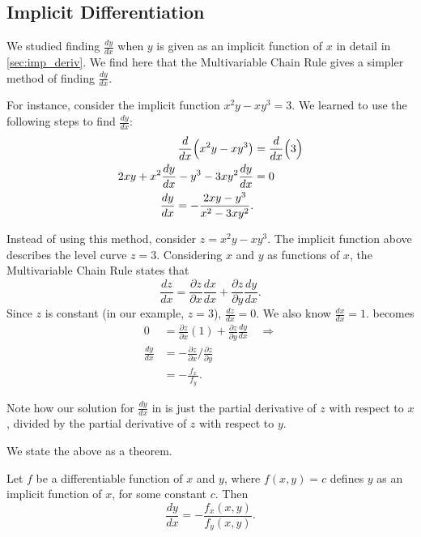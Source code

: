\subsection*{Implicit Differentiation}

We studied finding $\frac{dy}{dx}$ when $y$ is given as an implicit function of $x$ in detail in \autoref{sec:imp_deriv}. We find here that the Multivariable Chain Rule gives a simpler method of finding $\frac{dy}{dx}$.

For instance, consider the implicit function $x^2y-xy^3=3.$ We learned to use the following steps to find $\frac{dy}{dx}$:
\begin{align}
\frac{d}{dx}\Big(x^2y-xy^3\big) &= \frac{d}{dx}\Big(3\Big) \notag\\
2xy + x^2\frac{dy}{dx}-y^3-3xy^2\frac{dy}{dx} &= 0\notag \\
\frac{dy}{dx} = -\frac{2xy-y^3}{x^2-3xy^2}.\label{eq:mchain2}
\end{align}

Instead of using this method, consider $z=x^2y-xy^3$. The implicit function above describes the level curve $z=3$. Considering $x$ and $y$ as functions of $x$, the Multivariable Chain Rule states that
\begin{equation}\frac{dz}{dx} = \frac{\partial z}{\partial x}\frac{dx}{dx}+\frac{\partial z}{\partial y}\frac{dy}{dx}.\label{eq:mchain1}\end{equation}
Since $z$ is constant (in our example, $z=3$), $\frac{dz}{dx} = 0$. We also know $\frac{dx}{dx} = 1$.  becomes
\begin{align*}
0 &= \frac{\partial z}{\partial x}(1) + \frac{\partial z}{\partial y}\frac{dy}{dx} \quad \Rightarrow\\[5pt]
\frac{dy}{dx} &= -\frac{\partial z}{\partial x}\Big/\frac{\partial z}{\partial y}\\[5pt]
			&= -\frac{\,f_x\,}{f_y}.
\end{align*}

Note how our solution for $\frac{dy}{dx}$ in  is just the partial derivative of $z$ with respect to $x$, divided by the partial derivative of $z$ with respect to $y$.

We state the above as a theorem.

{Let $f$ be a differentiable function of $x$ and $y$, where $f(x,y)=c$ defines $y$ as  an implicit function of $x$, for some constant $c$. Then
$$\frac{dy}{dx} = - \frac{f_x(x,y)}{f_y(x,y)}.$$
}

